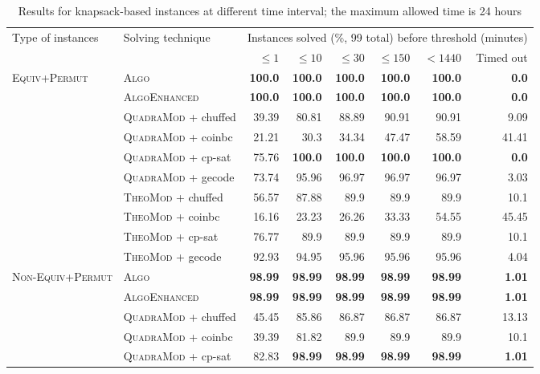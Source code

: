 \documentclass{book}
\begin{document}
\vspace{2cm}

\begin{table}[]\scriptsize\centering
\caption{Results for knapsack-based instances at different time interval; the maximum allowed time is 24 hours}
\begin{tabular}{@{}ll rr rr rr@{}}\toprule Type of instances & Solving technique  & \multicolumn{6}{c}{Instances solved (\%, 99 total) before threshold (minutes)}\\\cmidrule(l){3-8}&  &  $\leq 1$ &  $\leq 10$ &  $\leq 30$ &  $\leq 150$ &  $ < 1440$ & Timed out\\
\midrule
\multirow{10}{*}{\textsc{Equiv+Permut}} & \textsc{Algo}   & \bf 100.0 & \bf 100.0 & \bf 100.0 & \bf 100.0 & \bf 100.0 &  \bf 0.0 \\
& \textsc{AlgoEnhanced}   & \bf 100.0 & \bf 100.0 & \bf 100.0 & \bf 100.0 & \bf 100.0 &  \bf 0.0 \\
& \textsc{QuadraMod} + chuffed   & 39.39 & 80.81 & 88.89 & 90.91 & 90.91 & 9.09 \\
& \textsc{QuadraMod} + coinbc   & 21.21 & 30.3 & 34.34 & 47.47 & 58.59 & 41.41 \\
& \textsc{QuadraMod} + cp-sat   & 75.76 & \bf 100.0 & \bf 100.0 & \bf 100.0 & \bf 100.0 &  \bf 0.0 \\
& \textsc{QuadraMod} + gecode   & 73.74 & 95.96 & 96.97 & 96.97 & 96.97 & 3.03 \\
& \textsc{TheoMod} + chuffed   & 56.57 & 87.88 & 89.9 & 89.9 & 89.9 & 10.1 \\
& \textsc{TheoMod} + coinbc   & 16.16 & 23.23 & 26.26 & 33.33 & 54.55 & 45.45 \\
& \textsc{TheoMod} + cp-sat   & 76.77 & 89.9 & 89.9 & 89.9 & 89.9 & 10.1 \\
& \textsc{TheoMod} + gecode   & 92.93 & 94.95 & 95.96 & 95.96 & 95.96 & 4.04 \\
\midrule\multirow{10}{*}{\textsc{Non-Equiv+Permut}} & \textsc{Algo}   & \bf 98.99 & \bf 98.99 & \bf 98.99 & \bf 98.99 & \bf 98.99 &  \bf 1.01 \\
& \textsc{AlgoEnhanced}   & \bf 98.99 & \bf 98.99 & \bf 98.99 & \bf 98.99 & \bf 98.99 &  \bf 1.01 \\
& \textsc{QuadraMod} + chuffed   & 45.45 & 85.86 & 86.87 & 86.87 & 86.87 & 13.13 \\
& \textsc{QuadraMod} + coinbc   & 39.39 & 81.82 & 89.9 & 89.9 & 89.9 & 10.1 \\
& \textsc{QuadraMod} + cp-sat   & 82.83 & \bf 98.99 & \bf 98.99 & \bf 98.99 & \bf 98.99 &  \bf 1.01 \\

\end{tabular}
\end{table}
\end{document}
